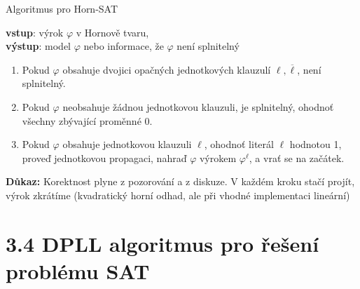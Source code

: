 \documentclass{beamer}
\begin{document}
\begin{frame}{Algoritmus pro Horn-SAT}

    \textbf{vstup}: výrok $\varphi$ v Hornově tvaru,\\ \textbf{výstup}: model $\varphi$ nebo informace, že $\varphi$ není splnitelný
    \begin{enumerate}
        \item Pokud $\varphi$ obsahuje dvojici opačných jednotkových klauzulí $\ell,\overline{\ell}$, není splnitelný.
        \item Pokud $\varphi$ neobsahuje žádnou jednotkovou klauzuli, je splnitelný, ohodnoť všechny zbývající proměnné 0.
        \item Pokud $\varphi$ obsahuje jednotkovou klauzuli $\ell$, ohodnoť literál $\ell$ hodnotou 1, proveď jednotkovou propagaci, nahraď $\varphi$ výrokem $\varphi^\ell$, a vrať se na začátek.
    \end{enumerate}


    \textbf{Důkaz:} {\small Korektnost plyne z pozorování a z diskuze. V každém kroku stačí projít, výrok zkrátíme (kvadratický horní odhad, ale při vhodné implementaci lineární)}\hfill\qedsymbol

\end{frame}


\section{3.4 DPLL algoritmus pro řešení problému SAT}
\end{document}
